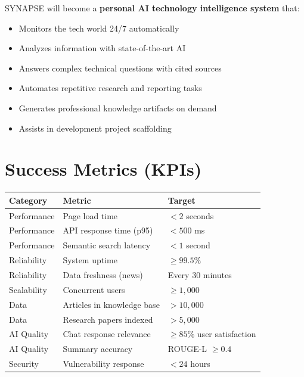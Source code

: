 \documentclass[12pt,a4paper]{report}
\begin{document}
SYNAPSE will become a \textbf{personal AI technology intelligence system} that:

\begin{itemize}
    \item Monitors the tech world 24/7 automatically
    \item Analyzes information with state-of-the-art AI
    \item Answers complex technical questions with cited sources
    \item Automates repetitive research and reporting tasks
    \item Generates professional knowledge artifacts on demand
    \item Assists in development project scaffolding
\end{itemize}

\section{Success Metrics (KPIs)}

\begin{center}
\begin{tabular}{lll}
\toprule
\textbf{Category} & \textbf{Metric} & \textbf{Target} \\
\midrule
Performance    & Page load time              & $< 2$ seconds \\
Performance    & API response time (p95)     & $< 500$ ms \\
Performance    & Semantic search latency     & $< 1$ second \\
Reliability    & System uptime               & $\geq 99.5\%$ \\
Reliability    & Data freshness (news)       & Every 30 minutes \\
Scalability    & Concurrent users            & $\geq 1,000$ \\
Data           & Articles in knowledge base  & $> 10,000$ \\
Data           & Research papers indexed     & $> 5,000$ \\
AI Quality     & Chat response relevance     & $\geq 85\%$ user satisfaction \\
AI Quality     & Summary accuracy            & ROUGE-L $\geq 0.4$ \\
Security       & Vulnerability response      & $< 24$ hours \\
\bottomrule
\end{tabular}
\end{center}
\end{document}
